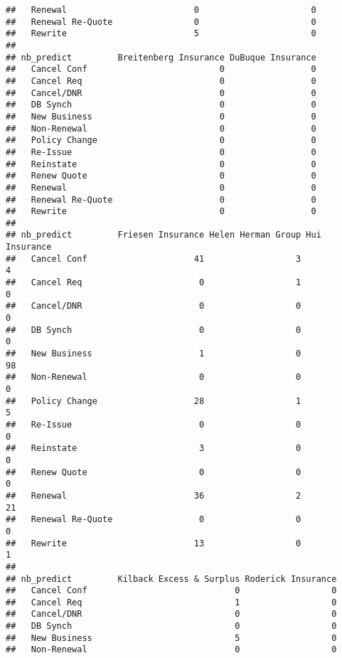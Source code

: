 \documentclass[]{article}
\begin{document}
\begin{verbatim}
##   Renewal                         0                      0
##   Renewal Re-Quote                0                      0
##   Rewrite                         5                      0
##                   
## nb_predict         Breitenberg Insurance DuBuque Insurance
##   Cancel Conf                          0                 0
##   Cancel Req                           0                 0
##   Cancel/DNR                           0                 0
##   DB Synch                             0                 0
##   New Business                         0                 0
##   Non-Renewal                          0                 0
##   Policy Change                        0                 0
##   Re-Issue                             0                 0
##   Reinstate                            0                 0
##   Renew Quote                          0                 0
##   Renewal                              0                 0
##   Renewal Re-Quote                     0                 0
##   Rewrite                              0                 0
##                   
## nb_predict         Friesen Insurance Helen Herman Group Hui Insurance
##   Cancel Conf                     41                  3             4
##   Cancel Req                       0                  1             0
##   Cancel/DNR                       0                  0             0
##   DB Synch                         0                  0             0
##   New Business                     1                  0            98
##   Non-Renewal                      0                  0             0
##   Policy Change                   28                  1             5
##   Re-Issue                         0                  0             0
##   Reinstate                        3                  0             0
##   Renew Quote                      0                  0             0
##   Renewal                         36                  2            21
##   Renewal Re-Quote                 0                  0             0
##   Rewrite                         13                  0             1
##                   
## nb_predict         Kilback Excess & Surplus Roderick Insurance
##   Cancel Conf                             0                  0
##   Cancel Req                              1                  0
##   Cancel/DNR                              0                  0
##   DB Synch                                0                  0
##   New Business                            5                  0
##   Non-Renewal                             0                  0

\end{verbatim}
\end{document}
